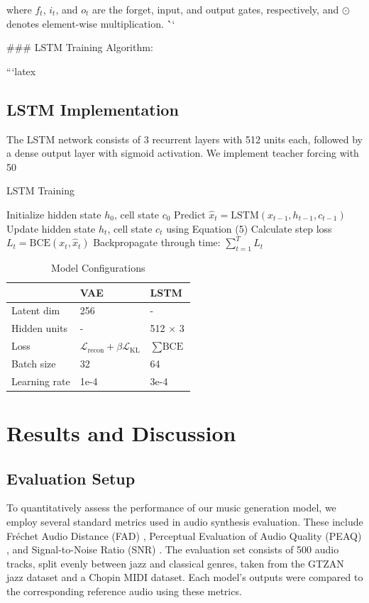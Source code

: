 \documentclass[conference]{IEEEtran}
\begin{document}
where $f_t$, $i_t$, and $o_t$ are the forget, input, and output gates, respectively, and $\odot$ denotes element-wise multiplication. 
\```

### LSTM Training Algorithm:

```latex
\subsection{LSTM Implementation}
The LSTM network consists of 3 recurrent layers with 512 units each, followed by a dense output layer with sigmoid activation. We implement teacher forcing with 50%

\begin{algorithm}[H]
\caption{LSTM Training}
\begin{algorithmic}[1]
\STATE Initialize hidden state $h_0$, cell state $c_0$
        \STATE Predict $\hat{x}_t = \text{LSTM}(x_{t-1}, h_{t-1}, c_{t-1})$
        \STATE Update hidden state $h_t$, cell state $c_t$ using Equation (5)
        \STATE Calculate step loss $L_t = \text{BCE}(x_t, \hat{x}_t)$
    \ENDFOR
    \STATE Backpropagate through time: $\sum_{t=1}^{T} L_t$
\ENDFOR
\end{algorithmic}
\end{algorithm}
\begin{table}[h]
\caption{Model Configurations}
\label{tab:config}
\centering
\begin{tabular}{l|ll}
& VAE & LSTM \\
\hline
Latent dim & 256 & - \\
Hidden units & - & 512 $\times$ 3 \\
Loss & $\mathcal{L}_{\text{recon}} + \beta \mathcal{L}_{\text{KL}}$ & $\sum \text{BCE}$ \\
Batch size & 32 & 64 \\
Learning rate & 1e-4 & 3e-4 \\
\end{tabular}
\end{table}




\section{Results and Discussion}

\subsection{Evaluation Setup}
To quantitatively assess the performance of our music generation model, we employ several standard metrics used in audio synthesis evaluation. These include Fréchet Audio Distance (FAD) \cite{kilgour2020audio}, Perceptual Evaluation of Audio Quality (PEAQ) \cite{hines1996peaq}, and Signal-to-Noise Ratio (SNR) \cite{kaltenberger2009generalized}. The evaluation set consists of 500 audio tracks, split evenly between jazz and classical genres, taken from the GTZAN jazz dataset and a Chopin MIDI dataset. Each model's outputs were compared to the corresponding reference audio using these metrics.
\end{document}
